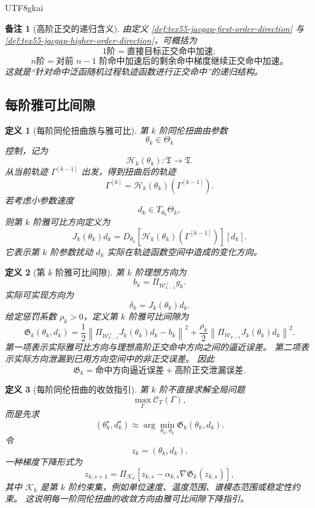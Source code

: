 \documentclass[12pt]{article}
\newtheorem{definition}{定义}[section]
\newtheorem{remark}{备注}[section]
\begin{document}
\begin{CJK*}{UTF8}{gkai}
\begin{remark}[高阶正交的递归含义]
由定义 \ref{def:tex55-jacgap-first-order-direction} 与
\ref{def:tex55-jacgap-higher-order-direction}，可概括为
\[
  \boxed{
  1\text{阶}
  =
  \text{直接目标正交命中加速};
  }
\]
\[
  \boxed{
  n\text{阶}
  =
  \text{对前 }n-1\text{ 阶命中加速后的剩余命中梯度继续正交命中加速。}
  }
\]
这就是“针对命中泛函随机过程轨迹函数进行正交命中”的递归结构。
\end{remark}

\subsection{每阶雅可比间隙}
\label{subsec:tex55-jacgap-definition}

\begin{definition}[每阶同伦扭曲族与雅可比]
\label{def:tex55-jacgap-homotopy-family}
第 \(k\) 阶同伦扭曲由参数
\[
  \theta_k\in\Theta_k
\]
控制，记为
\[
  \mathcal H_k(\theta_k):\mathfrak T\to\mathfrak T.
\]
从当前轨迹 \(\Gamma^{[k-1]}\) 出发，得到扭曲后的轨迹
\[
  \Gamma^{[k]}
  =
  \mathcal H_k(\theta_k)(\Gamma^{[k-1]}).
\]
若考虑小参数速度
\[
  d_k\in T_{\theta_k}\Theta_k,
\]
则第 \(k\) 阶雅可比方向定义为
\[
  J_k(\theta_k)d_k
  =
  D_{\theta_k}
  \left[
  \mathcal H_k(\theta_k)(\Gamma^{[k-1]})
  \right][d_k].
\]
它表示第 \(k\) 阶参数扰动 \(d_k\) 实际在轨迹函数空间中造成的变化方向。
\end{definition}

\begin{definition}[第 \(k\) 阶雅可比间隙]
\label{def:tex55-jacgap-gap}
第 \(k\) 阶理想方向为
\[
  b_k
  =
  \Pi_{\mathcal W_{k-1}^{\perp}}g_k.
\]
实际可实现方向为
\[
  \delta_k
  =
  J_k(\theta_k)d_k.
\]
给定惩罚系数 \(\rho_k>0\)，定义第 \(k\) 阶雅可比间隙为
\[
  \boxed{
  \mathfrak G_k(\theta_k,d_k)
  =
  \frac12
  \left\lVert
  \Pi_{\mathcal W_{k-1}^{\perp}}
  J_k(\theta_k)d_k
  -
  b_k
  \right\rVert^2
  +
  \frac{\rho_k}{2}
  \left\lVert
  \Pi_{\mathcal W_{k-1}}
  J_k(\theta_k)d_k
  \right\rVert^2.
  }
\]
第一项表示实际雅可比方向与理想高阶正交命中方向之间的逼近误差。
第二项表示实际方向泄漏到已用方向空间中的非正交误差。
因此
\[
  \boxed{
  \mathfrak G_k
  =
  \text{命中方向逼近误差}
  +
  \text{高阶正交泄漏误差}.
  }
\]
\end{definition}

\begin{definition}[每阶同伦扭曲的收敛指引]
\label{def:tex55-jacgap-gradient-step}
第 \(k\) 阶不直接求解全局问题
\[
  \max_\Gamma \mathcal C_T(\Gamma),
\]
而是先求
\[
  (\theta_k^\star,d_k^\star)
  \approx
  \arg\min_{\theta_k,d_k}
  \mathfrak G_k(\theta_k,d_k).
\]
令
\[
  z_k=(\theta_k,d_k).
\]
一种梯度下降形式为
\[
  z_{k,s+1}
  =
  \Pi_{\mathcal K_k}
  \left[
  z_{k,s}
  -
  \alpha_{k,s}
  \nabla \mathfrak G_k(z_{k,s})
  \right],
\]
其中 \(\mathcal K_k\) 是第 \(k\) 阶约束集，例如单位速度、温度范围、谱模态范围或稳定性约束。
这说明每一阶同伦扭曲的收敛方向由雅可比间隙下降指引。
\end{definition}


\end{CJK*}
\end{document}
